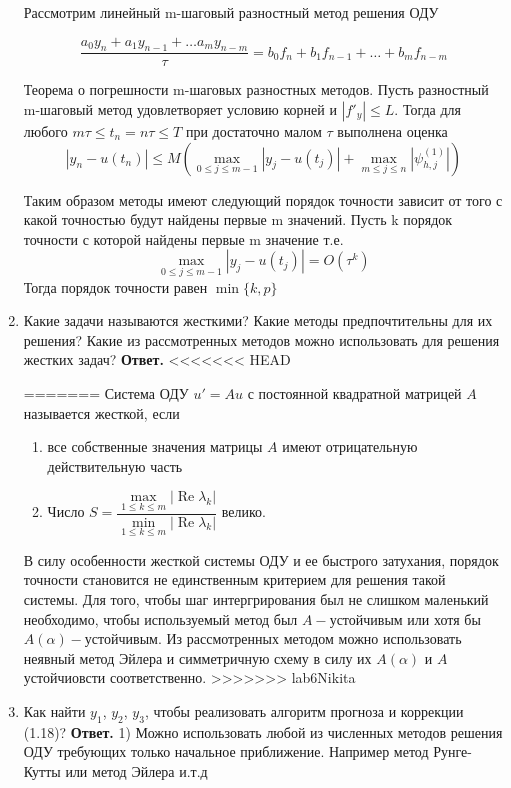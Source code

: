 \documentclass{article}
\newcommand{\RE}{\mathop{\mathrm{Re}}\nolimits}
\begin{document}
\begin{enumerate}
	
	Рассмотрим линейный m-шаговый разностный метод решения ОДУ
	
	
	\[
	\frac{a_0y_n+a_1y_{n-1}+ \ldots a_my_{n-m}}{\tau} = b_0f_n+b_1f_{n-1}+ \ldots + b_mf_{n-m}
	\]
	
	Теорема о погрешности  m-шаговых разностных методов. Пусть разностный m-шаговый метод удовлетворяет условию корней и $|f'_y| \le L$. Тогда для любого $m\tau \le t_n =n\tau \le T$ при достаточно малом $\tau$ выполнена оценка
	\[
	|y_n-u(t_n)| \le M \left( \max\limits_{0\le j\le m-1}|y_j-u(t_j)|+\max \limits_{m\le j \le n}|\psi_{h,j}^{(1)}|\right)
	\]
	
	
	Таким образом методы имеют следующий порядок точности зависит от того с какой точностью будут найдены первые m значений. Пусть k порядок точности с которой найдены первые m значение т.е. 
	\[
	\max\limits_{0\le j\le m-1}|y_j-u(t_j)| = O(\tau^k)
	\]
	Тогда порядок точности равен $\min\{k, p\}$
        \item Какие задачи называются жесткими? Какие методы предпочтительны для их решения? Какие из рассмотренных
        методов можно использовать для решения жестких задач?
        \newline
        {\bfseries Ответ. } 
<<<<<<< HEAD
        
=======
        Система ОДУ $u' = Au$ с постоянной квадратной матрицей $A$ называется жесткой, если 
		\begin{enumerate}
			\item все собственные значения матрицы $A$ имеют отрицательную действительную часть 
			\item Число $S = \dfrac{\max\limits_{1 \leqslant k \leqslant m} |\RE \lambda_k|}{\min\limits_{1 \leqslant k \leqslant m} |\RE \lambda_k|}$
			велико.
		\end{enumerate}
		В силу особенности жесткой системы ОДУ и ее быстрого затухания, порядок точности становится 
		не единственным критерием для решения такой системы. Для того, чтобы шаг интергрирования 
		был не слишком маленький необходимо, чтобы используемый метод был $A-$устойчивым 
		или хотя бы $A(\alpha)-$устойчивым. Из рассмотренных методом можно использовать неявный метод
		Эйлера и симметричную схему в силу их $A(\alpha)$ и $A$ устойчиовсти соответственно. 
>>>>>>> lab6Nikita
        \item Как найти $y_1$, $y_2$, $y_3$, чтобы реализовать алгоритм прогноза
        и коррекции (1.18)?
        \newline
        {\bfseries Ответ. } 
        1) Можно использовать любой из численных методов решения ОДУ требующих только начальное приближение. Например метод Рунге-Кутты или метод Эйлера и.т.д
	

\end{enumerate}
\end{document}
